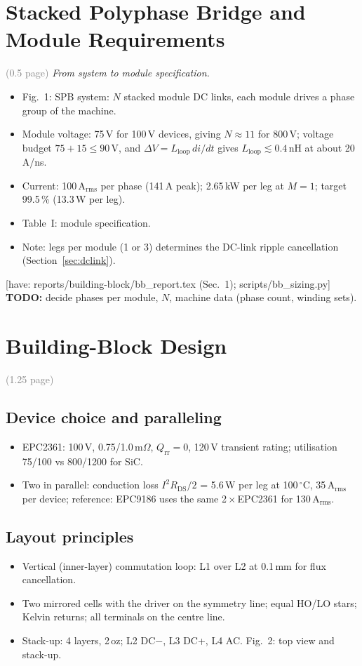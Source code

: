 \documentclass[conference]{IEEEtran}
\newcommand{\plan}[1]{\textcolor{blue!60!black}{\textit{#1}}}
\newcommand{\todo}[1]{\textcolor{red!70!black}{\textbf{TODO:} #1}}
\newcommand{\have}[1]{\textcolor{green!40!black}{\small[have: #1]}}
\newcommand{\pages}[1]{\hfill\textcolor{gray}{\small(#1 page)}}
\begin{document}
\section{Stacked Polyphase Bridge and Module Requirements}\pages{0.5}
\plan{From system to module specification.}
\begin{itemize}
\item Fig.~1: SPB system: $N$ stacked module DC links, each module drives a phase group of the machine.
\item Module voltage: 75\,V for 100\,V devices, giving $N\approx11$ for 800\,V; voltage budget $75+15\leq90$\,V, and $\Delta V=L_\mathrm{loop}\,di/dt$ gives $L_\mathrm{loop}\lesssim0.4$\,nH at about 20\,A/ns.
\item Current: 100\,A$_\mathrm{rms}$ per phase (141\,A peak); 2.65\,kW per leg at $M=1$; target 99.5\,\% (13.3\,W per leg).
\item Table~I: module specification.
\item Note: legs per module (1 or 3) determines the DC-link ripple cancellation (Section~\ref{sec:dclink}).
\end{itemize}
\have{reports/building-block/bb\_report.tex (Sec.~1); scripts/bb\_sizing.py}
\todo{decide phases per module, $N$, machine data (phase count, winding sets).}

\section{Building-Block Design}\label{sec:design}\pages{1.25}
\subsection{Device choice and paralleling}
\begin{itemize}
\item EPC2361: 100\,V, 0.75/1.0\,m$\Omega$, $Q_\mathrm{rr}=0$, 120\,V transient rating; utilisation 75/100 vs 800/1200 for SiC.
\item Two in parallel: conduction loss $I^2R_\mathrm{DS}/2$ = 5.6\,W per leg at 100\,$^\circ$C, 35\,A$_\mathrm{rms}$ per device; reference: EPC9186 uses the same 2\,$\times$\,EPC2361 for 130\,A$_\mathrm{rms}$.
\end{itemize}
\subsection{Layout principles}
\begin{itemize}
\item Vertical (inner-layer) commutation loop: L1 over L2 at 0.1\,mm for flux cancellation.
\item Two mirrored cells with the driver on the symmetry line; equal HO/LO stars; Kelvin returns; all terminals on the centre line.
\item Stack-up: 4 layers, 2\,oz; L2 DC$-$, L3 DC+, L4 AC. Fig.~2: top view and stack-up.
\end{itemize}
\end{document}
